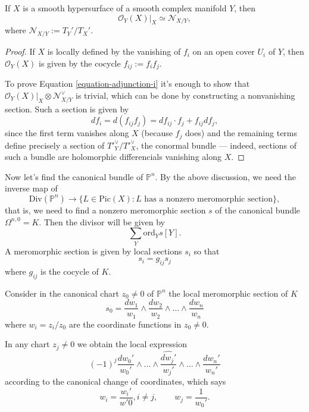 \begin{theorem}
\label{theorem-adjunction-formula-i}
\begin{reference}
\cite[p.146]{GH}
\end{reference}
If $X$ is a smooth hypersurface of a smooth
complex manifold $Y$, then
\begin{equation}
\label{equation-adjunction-i}
\mathcal{O}_Y(X)|_{X} \simeq
\mathcal{N}_{X/Y},
\end{equation}
where $\mathcal{N}_{X/Y}:=T_Y'/T_X'$.
\end{theorem}

\begin{proof}
If $X$ is locally defined
by the vanishing of $f_i$ on an open cover
$U_i$ of $Y$,
then $\mathcal{O}_Y(X)$ is given by the
cocycle $f_{ij}:=f_if_j$.

To prove Equation \ref{equation-adjunction-i}
it's enough to show that
$\mathcal{O}_Y(X)|_{X}\otimes
\mathcal{N}^\vee_{X/Y}$
is trivial, which can be done by constructing
a nonvanishing section.
Such a section is given by
$$
df_i=d(f_{ij}f_j)=df_{ij}\cdot
f_j+f_{ij}df_j,
$$
since the first term vanishes along $X$
(because $f_j$ does)
and the remaining terms define precisely a
section
of ${T'}^\vee_Y/{T'}^\vee_X$,
the conormal bundle ---
indeed, sections of such a bundle
are holomorphic differencials vanishing along
$X$.
\end{proof}

\noindent
Now let's find the canonical bundle of
$\mathbb{P}^n$.
By the above discussion, we need the inverse
map of
$$
\text{Div}(\mathbb{P}^n) \to \{L \in
\text{Pic}(X):
\text{$L$ has a nonzero meromorphic
section}\},
$$
that is, we need to find a nonzero
meromorphic section $s$
of the canonical bundle $\Omega^{n,0}=K$.
Then the divisor will be given by
$$
\sum_Y \text{ord}_Ys [Y].
$$
A meromorphic section is given by local
sections $s_i$
so that
$$
s_i=g_{ij}s_j
$$
where $g_{ij}$ is the cocycle of $K.$

Consider in the canonical chart $z_0\neq 0$
of $\mathbb{P}^n$
the local meromorphic section of $K$
$$
s_0=
\frac{dw_1}{w_1}\wedge\frac{dw_2}{w_2}\wedge…
\wedge\frac{dw_n}{w_n}
$$
where $w_i=z_i/z_0$ are the coordinate
functions in $z_0\neq 0$.

In any chart $z_j\neq 0$ we obtain the local
expression
$$
(-1)^j\frac{dw_0'}{w_0'}
\wedge…
\wedge \widehat{\frac{dw_j'}{w_j'}}
\wedge…
\wedge \frac{dw_n'}{w_n'}
$$
according to the canonical change of
coordinates, which says
$$
w_i=\frac{w_i'}{w'0}, i\neq j,\qquad
w_j=\frac{1}{w_0'}.
$$

